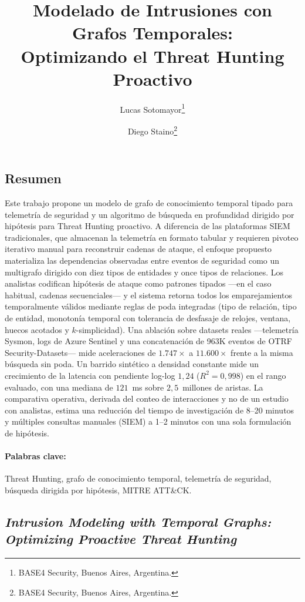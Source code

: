\documentclass[11pt,a4paper]{article}
\title{\vspace{-1.2cm}\textbf{Modelado de Intrusiones con Grafos Temporales:\\
Optimizando el Threat Hunting Proactivo}}
\author{Lucas Sotomayor\thanks{BASE4 Security, Buenos Aires, Argentina.
\code{lsotomayor@base4sec.com}} \and
Diego Staino\thanks{BASE4 Security, Buenos Aires, Argentina.
\code{dstaino@base4sec.com}}}
\date{}
\begin{document}
\maketitle

\subsection*{Resumen}
\small
Este trabajo propone un modelo de grafo de conocimiento temporal tipado para
telemetría de seguridad y un algoritmo de búsqueda en profundidad dirigido por
hipótesis para Threat Hunting proactivo. A diferencia de las plataformas SIEM
tradicionales, que almacenan la telemetría en formato tabular y requieren
pivoteo iterativo manual para reconstruir cadenas de ataque, el enfoque
propuesto materializa las dependencias observadas entre eventos de seguridad
como un multigrafo dirigido con diez tipos de entidades y once tipos de
relaciones. Los analistas codifican hipótesis de ataque como patrones tipados
---en el caso habitual, cadenas secuenciales--- y el sistema retorna todos los
emparejamientos temporalmente válidos mediante reglas de poda integradas (tipo
de relación, tipo de entidad, monotonía temporal con tolerancia de desfasaje de
relojes, ventana, huecos acotados y $k$-simplicidad). Una ablación sobre
datasets reales ---telemetría Sysmon, logs de Azure Sentinel y una
concatenación de 963K eventos de OTRF Security-Datasets--- mide aceleraciones
de $1.747\times$ a $11.600\times$ frente a la misma búsqueda sin poda. Un
barrido sintético a densidad constante mide un crecimiento de la latencia con
pendiente log-log $1{,}24$ ($R^2 = 0{,}998$) en el rango evaluado, con una
mediana de $121$~ms sobre $2{,}5$~millones de aristas. La comparativa
operativa, derivada del conteo de interacciones y no de un estudio con
analistas, estima una reducción del tiempo de investigación de 8--20 minutos y
múltiples consultas manuales (SIEM) a 1--2 minutos con una sola formulación de
hipótesis.

\paragraph{Palabras clave:} Threat Hunting, grafo de conocimiento temporal,
telemetría de seguridad, búsqueda dirigida por hipótesis, MITRE ATT\&CK.

\subsection*{\textit{Intrusion Modeling with Temporal Graphs: Optimizing
Proactive Threat Hunting}}
\end{document}
